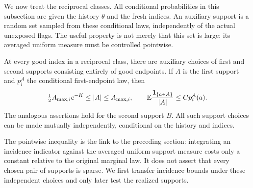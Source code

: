 We now treat the reciprocal classes. All conditional probabilities
in this subsection are given the history \(\theta\) and the fresh
indices. An auxiliary support is a random set sampled from these
conditional laws, independently of the actual unexposed flags.
The useful property is not merely that this set is large: its
averaged uniform measure must be controlled pointwise.

\begin{lemma}\label{comp:supports}
At every good index in a reciprocal class, there are auxiliary
choices of first and second supports consisting entirely of good
endpoints. If \(A\) is the first support and \(p_i^A\) the
conditional first-endpoint law, then
\begin{equation}\label{comp:support-measure}
 \tfrac12 A_{\max,i}e^{-K}\le |A|\le A_{\max,i},
 \qquad
 \mathbb E\frac{\boldsymbol 1_{\{a\in A\}}}{|A|}
       \le C p_i^A(a).
\end{equation}
The analogous assertions hold for the second support \(B\).
All such support choices can be made mutually independently,
conditional on the history and indices.
\end{lemma}

The pointwise inequality is the link to the preceding section: integrating
an incidence indicator against the averaged uniform support measure costs
only a constant relative to the original marginal law. It does not assert
that every chosen pair of supports is sparse. We first transfer incidence
bounds under these independent choices and only later test the realized
supports.

